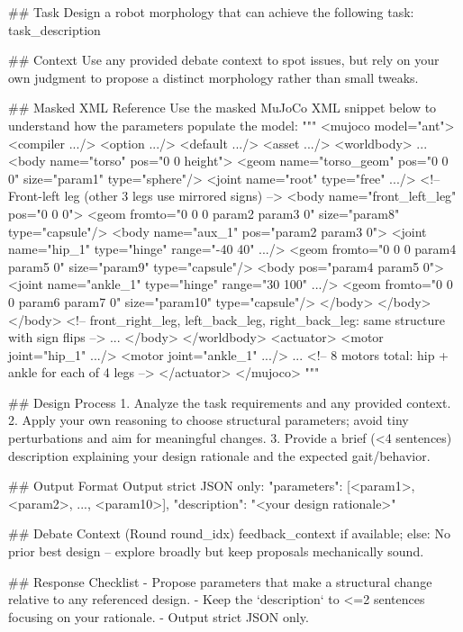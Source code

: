 \begin{promptbox}
## Task
Design a robot morphology that can achieve the following task: {task_description}

## Context
Use any provided debate context to spot issues, but rely on your own judgment to propose a distinct morphology rather than small tweaks.

## Masked XML Reference
Use the masked MuJoCo XML snippet below to understand how the parameters populate the model:
"""
<mujoco model="ant">
  <compiler .../> <option .../> <default .../> <asset .../>
  <worldbody>
    ...
    <body name="torso" pos="0 0 {height}">
      <geom name="torso_geom" pos="0 0 0" size="{param1}" type="sphere"/>
      <joint name="root" type="free" .../>
      <!-- Front-left leg (other 3 legs use mirrored signs) -->
      <body name="front_left_leg" pos="0 0 0">
        <geom fromto="0 0 0 {param2} {param3} 0" size="{param8}" type="capsule"/>
        <body name="aux_1" pos="{param2} {param3} 0">
          <joint name="hip_1" type="hinge" range="-40 40" .../>
          <geom fromto="0 0 0 {param4} {param5} 0" size="{param9}" type="capsule"/>
          <body pos="{param4} {param5} 0">
            <joint name="ankle_1" type="hinge" range="30 100" .../>
            <geom fromto="0 0 0 {param6} {param7} 0" size="{param10}" type="capsule"/>
          </body>
        </body>
      </body>
      <!-- front_right_leg, left_back_leg, right_back_leg: same structure with sign flips -->
      ...
    </body>
  </worldbody>
  <actuator>
    <motor joint="hip_1" .../> <motor joint="ankle_1" .../>
    ... <!-- 8 motors total: hip + ankle for each of 4 legs -->
  </actuator>
</mujoco>
"""

## Design Process
1. Analyze the task requirements and any provided context.
2. Apply your own reasoning to choose structural parameters; avoid tiny perturbations and aim for meaningful changes.
3. Provide a brief (<4 sentences) description explaining your design rationale and the expected gait/behavior.

## Output Format
Output strict JSON only:
{
  "parameters": [<param1>, <param2>, ..., <param10>],
  "description": "<your design rationale>"
}
\end{promptbox}

\begin{promptbox}
## Debate Context (Round {round_idx})
{feedback_context if available; else:
No prior best design -- explore broadly but keep proposals mechanically sound.}

## Response Checklist
- Propose parameters that make a structural change relative to any referenced design.
- Keep the `description` to <=2 sentences focusing on your rationale.
- Output strict JSON only.
\end{promptbox}

